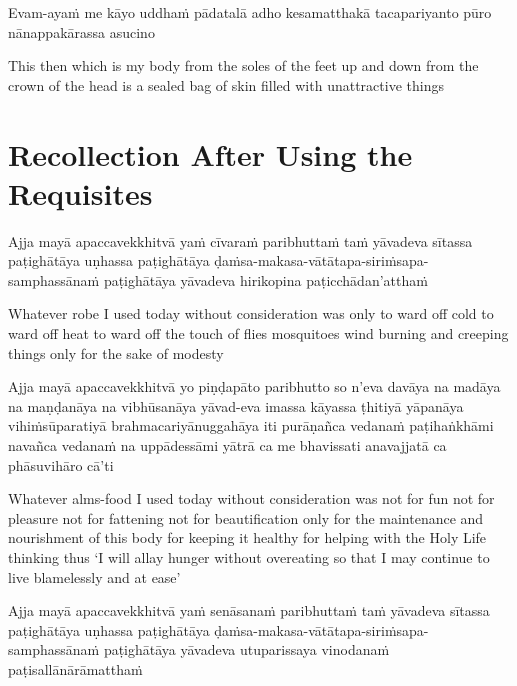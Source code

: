 Evam-ayaṁ me kāyo uddhaṁ pādatalā adho kesamatthakā tacapariyanto pūro nānappakārassa asucino

\begin{english}
  This then which is my body from the soles of the feet up and down from the crown of the head is a sealed bag of skin filled with unattractive things
\end{english}


\clearpage

\section{Recollection After Using the Requisites}

\begin{leader}
\end{leader}


Ajja mayā apaccavekkhitvā yaṁ cīvaraṁ paribhuttaṁ taṁ yāvadeva sītassa
paṭighātāya uṇhassa paṭighātāya ḍaṁsa-makasa-vātātapa-siriṁsapa-samphassānaṁ
paṭighātāya yāvadeva hirikopina paṭicchādan'atthaṁ

\begin{english}
  Whatever robe I used today without consideration was only to ward off cold
  to ward off heat to ward off the touch of flies mosquitoes wind burning
  and creeping things only for the sake of modesty
\end{english}

Ajja mayā apaccavekkhitvā yo piṇḍapāto paribhutto so n'eva davāya na madāya
na maṇḍanāya na vibhūsanāya yāvad-eva imassa kāyassa ṭhitiyā yāpanāya
vihiṁsūparatiyā brahmacariyānuggahāya iti purāṇañca vedanaṁ paṭihaṅkhāmi
navañca vedanaṁ na uppādessāmi yātrā ca me bhavissati anavajjatā ca phāsuvihāro
cā'ti

\begin{english}
  Whatever alms-food I used today without consideration was not for fun not
  for pleasure not for fattening not for beautification only for the
  maintenance and nourishment of this body for keeping it healthy for helping
  with the Holy Life thinking thus `I will allay hunger without overeating so
  that I may continue to live blamelessly and at ease'
\end{english}

Ajja mayā apaccavekkhitvā yaṁ senāsanaṁ paribhuttaṁ taṁ yāvadeva sītassa
paṭighātāya uṇhassa paṭighātāya ḍaṁsa-makasa-vātātapa-siriṁsapa-samphassānaṁ
paṭighātāya yāvadeva utuparissaya vinodanaṁ paṭisallānārāmatthaṁ


